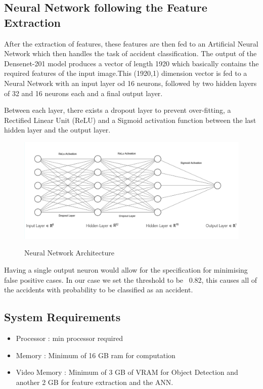\documentclass[ 12pt,a4paper,twocolumn,fleqn]{article}
\begin{document}
\begin{adjustwidth}{3.5em}{0pt}
\newpage
  \pagestyle{fancy}

\subsection{Neural Network following the Feature Extraction}
After the extraction of features, these features are then fed to an Artificial Neural Network which then handles the task of accident classification. The output of the Densenet-201 model produces a vector of length 1920 which basically contains the required features of the input image.This (1920,1) dimension vector is fed to a Neural Network with an input layer od 16 neurons, followed by two hidden layers of 32 and 16 neurons each and a final output layer.

\hspace{0.2cm}

Between each layer, there exists a dropout layer to prevent over-fitting, a Rectified Linear Unit (ReLU) and a Sigmoid activation function between the last hidden layer and the output layer.

\begin{figure}[H]
\begin{center}
    \hspace*{0.4in}
    \includegraphics[scale=0.4]{media/ann.png}
    \centering
    \\
  \caption{ Neural Network Architecture}
\end{center}
\end{figure}

Having a single output neuron would allow for the specification for minimising false positive cases. In our case we set the threshold to be ~0.82, this causes all of the accidents with probability  to be classified as an accident.


\hspace{0.2cm}


\subsection{System Requirements}
\begin{itemize}
    \item Processor : min processor required
    \item Memory : Minimum of 16 GB ram for computation
    \item Video Memory : Minimum of 3 GB of VRAM for Object Detection and another 2 GB for feature extraction and the ANN.
\end{itemize}


\end{adjustwidth}
\end{document}
